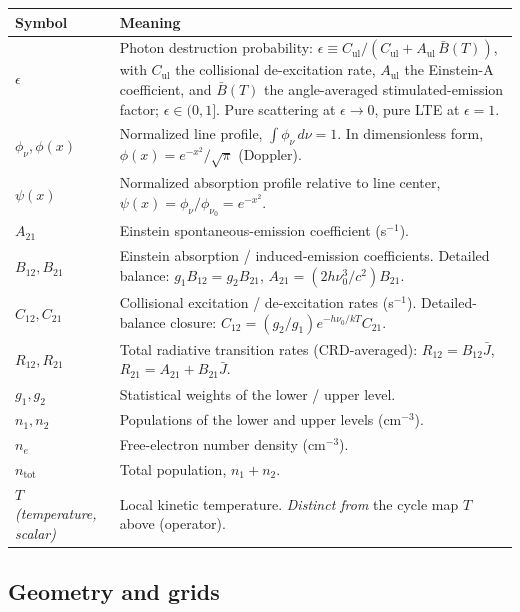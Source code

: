 \documentclass[11pt]{article}
\newcommand{\Jbar}{\bar{J}}
\begin{document}
\noindent\begin{tabular}{@{}p{1.4in}p{4.8in}@{}}
\toprule
\textbf{Symbol} & \textbf{Meaning} \\ \midrule
$\epsilon$ & Photon destruction probability: $\epsilon \equiv C_\mathrm{ul}/(C_\mathrm{ul}+A_\mathrm{ul}\,\bar{B}(T))$, with $C_\mathrm{ul}$ the collisional de-excitation rate, $A_\mathrm{ul}$ the Einstein-A coefficient, and $\bar{B}(T)$ the angle-averaged stimulated-emission factor; $\epsilon \in (0, 1]$.  Pure scattering at $\epsilon \to 0$, pure LTE at $\epsilon = 1$. \\
$\phi_\nu, \phi(x)$ & Normalized line profile, $\int \phi_\nu \, d\nu = 1$.  In dimensionless form, $\phi(x) = e^{-x^2}/\sqrt{\pi}$ (Doppler). \\
$\psi(x)$ & Normalized absorption profile relative to line center, $\psi(x) = \phi_\nu/\phi_{\nu_0} = e^{-x^2}$. \\
$A_{21}$ & Einstein spontaneous-emission coefficient (s$^{-1}$). \\
$B_{12}, B_{21}$ & Einstein absorption / induced-emission coefficients.  Detailed balance: $g_1 B_{12} = g_2 B_{21}$, $A_{21} = (2 h\nu_0^3 / c^2) B_{21}$. \\
$C_{12}, C_{21}$ & Collisional excitation / de-excitation rates (s$^{-1}$).  Detailed-balance closure: $C_{12} = (g_2/g_1) e^{-h\nu_0/kT} C_{21}$. \\
$R_{12}, R_{21}$ & Total radiative transition rates (CRD-averaged): $R_{12} = B_{12} \Jbar$, $R_{21} = A_{21} + B_{21} \Jbar$. \\
$g_1, g_2$ & Statistical weights of the lower / upper level. \\
$n_1, n_2$ & Populations of the lower and upper levels (cm$^{-3}$). \\
$n_e$ & Free-electron number density (cm$^{-3}$). \\
$n_{\text{tot}}$ & Total population, $n_1 + n_2$. \\
$T$ \emph{(temperature, scalar)} & Local kinetic temperature.  \emph{Distinct from} the cycle map $T$ above (operator). \\
\bottomrule
\end{tabular}

\subsection*{Geometry and grids}
\end{document}
